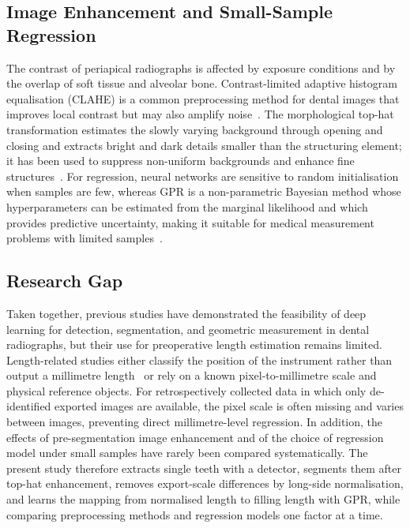 \subsection{Image Enhancement and Small-Sample Regression}
The contrast of periapical radiographs is affected by exposure conditions and by the overlap of soft tissue and alveolar bone. Contrast-limited adaptive histogram equalisation (CLAHE) is a common preprocessing method for dental images that improves local contrast but may also amplify noise~. The morphological top-hat transformation estimates the slowly varying background through opening and closing and extracts bright and dark details smaller than the structuring element; it has been used to suppress non-uniform backgrounds and enhance fine structures~. For regression, neural networks are sensitive to random initialisation when samples are few, whereas GPR is a non-parametric Bayesian method whose hyperparameters can be estimated from the marginal likelihood and which provides predictive uncertainty, making it suitable for medical measurement problems with limited samples~.

\subsection{Research Gap}
Taken together, previous studies have demonstrated the feasibility of deep learning for detection, segmentation, and geometric measurement in dental radiographs, but their use for preoperative length estimation remains limited. Length-related studies either classify the position of the instrument rather than output a millimetre length~\cite{Saghiri2012a} or rely on a known pixel-to-millimetre scale and physical reference objects. For retrospectively collected data in which only de-identified exported images are available, the pixel scale is often missing and varies between images, preventing direct millimetre-level regression. In addition, the effects of pre-segmentation image enhancement and of the choice of regression model under small samples have rarely been compared systematically. The present study therefore extracts single teeth with a detector, segments them after top-hat enhancement, removes export-scale differences by long-side normalisation, and learns the mapping from normalised length to filling length with GPR, while comparing preprocessing methods and regression models one factor at a time.
